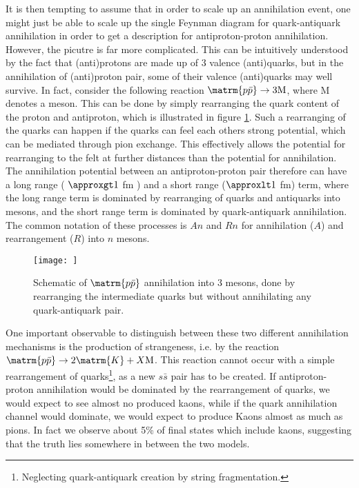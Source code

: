 It is then tempting to assume that in order to scale up an annihilation event, one might just be able to scale up the single Feynman diagram for quark-antiquark annihilation in order to get a description for antiproton-proton annihilation. However, the picutre is far more complicated. This can be intuitively understood by the fact that (anti)protons are made up of 3 valence (anti)quarks, but in the annihilation of (anti)proton pair, some of their valence (anti)quarks may well survive. In fact, consider the following reaction $\matrm{p\bar{p}} \rightarrow 3 \mathrm{M}$, where M denotes a meson. This can be done by simply rearranging the quark content of the proton and antiproton, which is illustrated in figure \ref{fig:Quark_Rearrangement}. Such a rearranging of the quarks can happen if the quarks can feel each others strong potential, which can be mediated through pion exchange. This effectively allows the potential for rearranging to the felt at further distances than the potential for annihilation. The annihilation potential between an antiproton-proton pair therefore can have a long range ( $\approxgt 1$ fm ) and a short range ($\approxlt 1$ fm) term, where the long range term is dominated by rearranging of quarks and antiquarks into mesons, and the short range term is dominated by quark-antiquark annihilation. The common notation of these processes is $An$ and $Rn$ for annihilation ($A$) and rearrangement ($R$) into $n$ mesons.\\

\begin{figure}
    \centering
    \texttt{[image: ]}
    \caption{Schematic of $\matrm{p\bar{p}}$ annihilation into 3 mesons, done by rearranging the intermediate quarks but without annihilating any quark-antiquark pair.}
    \label{fig:Quark_Rearrangement}
\end{figure}

One important observable to distinguish between these two different annihilation mechanisms is the production of strangeness, i.e. by the reaction $\matrm{p\bar{p}} \rightarrow 2\matrm{K}+ X\mathrm{M}$. This reaction cannot occur with a simple rearrangement of quarks\footnote{Neglecting quark-antiquark creation by string fragmentation.}, as a new $s\bar{s}$ pair has to be created. If antiproton-proton annihilation would be dominated by the rearrangement of quarks, we would expect to see almost no produced kaons, while if the quark annihilation channel would dominate, we would expect to produce Kaons almost as much as pions. In fact we observe about 5\% of final states which include kaons, suggesting that the truth lies somewhere in between the two models. \\

